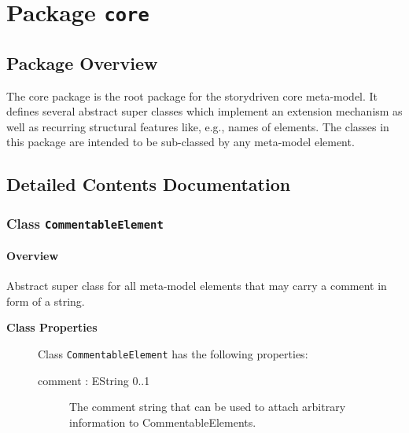 \section{Package \bfseries \texttt{core}\normalfont}
\subsection{Package Overview}
	
			
The core package is the root package for the storydriven core meta-model. It defines several abstract super classes which implement an extension mechanism as well as recurring structural features like, e.g., names of elements. The classes in this package are intended to be sub-classed by any meta-model element.	
		
	
			
		



\subsection{Detailed Contents Documentation}
\subsubsection{\Large{Class \bfseries \texttt{CommentableElement}\normalfont}}
\label{cls:core::CommentableElement} 
\paragraph{Overview}

	
			
Abstract super class for all meta-model elements that may carry a comment in form of a string.	
		
	


\begin{description}

	\item[\textbf{Class Properties}] Class \texttt{CommentableElement} has the following properties:
	\begin{description}
\item[comment : EString 			0..1]

\hspace{\fill}
\nopagebreak


	
			
The comment string that can be used to attach arbitrary information to CommentableElements.	
		
	
	\end{description}
	
	

\end{description}

